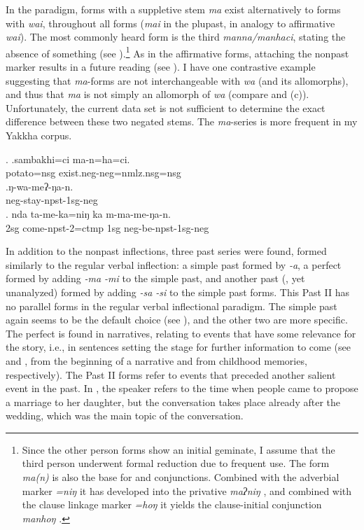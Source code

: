 \largerpage[-1]
In the  paradigm, forms with a suppletive stem  \emph{ma} exist alternatively to forms with \emph{wai}, throughout all  forms (\emph{mai} in the plupast, in analogy to affirmative \emph{wai}). The most commonly heard form is the third  \emph{manna/man\-ha\-ci}, stating the absence of something (see \Next[a]).\footnote{Since the other person forms show an initial geminate, I assume that the third person underwent formal reduction due to frequent use. The form \emph{ma(n)} is also the base for  and conjunctions. Combined with the adverbial  marker \emph{=niŋ} it has  developed into the privative  \emph{maʔniŋ} , and combined with the clause linkage marker  \emph{=hoŋ} it yields  the clause-initial conjunction \emph{manhoŋ} .} As in the affirmative forms, attaching the nonpast marker results in a future reading (see  \Next[c]). I have one contrastive example suggesting that \emph{ma}-forms are not interchangeable with \emph{wa} (and its allomorphs), and thus that \emph{ma} is not simply an allomorph of \emph{wa} (compare \Next[b] and (c)). Unfortunately, the current data set is not sufficient to determine the exact difference between these two negated stems. The \emph{ma}-series is more frequent in my Yakkha corpus. 

\ex. \ag.sambakhi=ci ma-n=ha=ci.\\
potato{\sc =nsg} exist{\sc .neg-neg=nmlz.nsg=nsg}\\
\bg.ŋ-wa-meʔ-ŋa-n.\\
{\sc neg-}stay{\sc -npst-1sg-neg}\\
\bg.      nda ta-me-ka=niŋ ka m-ma-me-ŋa-n.\\
{\sc 2sg} come{\sc -npst-2=ctmp} {\sc 1sg} {\sc neg-}be{\sc -npst-1sg-neg}\\


In addition to the nonpast inflections, three past series were found, formed similarly to the regular verbal inflection: a simple past formed by \emph{-a},  a perfect formed by adding \emph{-ma \ti -mi} to the simple past, and another past  (, yet unanalyzed) formed by adding \emph{-sa \ti -si} to the simple past forms. This Past II  has no parallel forms in the regular verbal inflectional paradigm.  The simple past again seems to be the default choice (see \Next[a]), and the other two are more specific. The perfect is found in narratives, relating to events that have some relevance for the story, i.e., in sentences setting the stage for further information to come (see \Next[b] and \Next[c], from the beginning of a narrative and from childhood memories, respectively). The Past II forms refer to events that preceded another salient event in the past. In \Next[d], the speaker  refers to the time when people came to propose a marriage to her daughter, but the conversation  takes place already after the wedding, which was the main topic of the conversation. 

